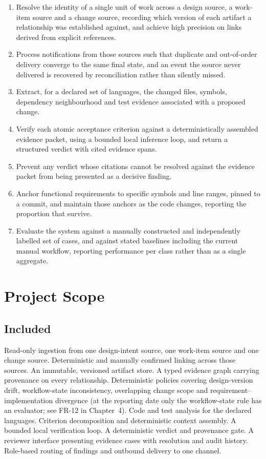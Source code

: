 \begin{enumerate}
  \item Resolve the identity of a single unit of work across a design source, a
        work-item source and a change source, recording which version of each
        artifact a relationship was established against, and achieve high
        precision on links derived from explicit references.
  \item Process notifications from those sources such that duplicate and
        out-of-order delivery converge to the same final state, and an event
        the source never delivered is recovered by reconciliation rather than
        silently missed.
  \item Extract, for a declared set of languages, the changed files, symbols,
        dependency neighbourhood and test evidence associated with a proposed
        change.
  \item Verify each atomic acceptance criterion against a deterministically
        assembled evidence packet, using a bounded local inference loop, and
        return a structured verdict with cited evidence spans.
  \item Prevent any verdict whose citations cannot be resolved against the
        evidence packet from being presented as a decisive finding.
  \item Anchor functional requirements to specific symbols and line ranges,
        pinned to a commit, and maintain those anchors as the code changes,
        reporting the proportion that survive.
  \item Evaluate the system against a manually constructed and independently
        labelled set of cases, and against stated baselines including the
        current manual workflow, reporting performance per class rather than as
        a single aggregate.
\end{enumerate}

\section{Project Scope}

\subsection*{Included}

Read-only ingestion from one design-intent source, one work-item source and one
change source. Deterministic and manually confirmed linking across those
sources. An immutable, versioned artifact store. A typed evidence graph carrying
provenance on every relationship. Deterministic policies covering design-version
drift, workflow-state inconsistency, overlapping change scope and
requirement--implementation divergence (at the reporting date only the
workflow-state rule has an evaluator; see FR-12 in Chapter~4). Code and test analysis for the declared
languages. Criterion decomposition and deterministic context assembly. A bounded
local verification loop. A deterministic verdict and provenance gate. A reviewer
interface presenting evidence cases with resolution and audit history.
Role-based routing of findings and outbound delivery to one channel.

